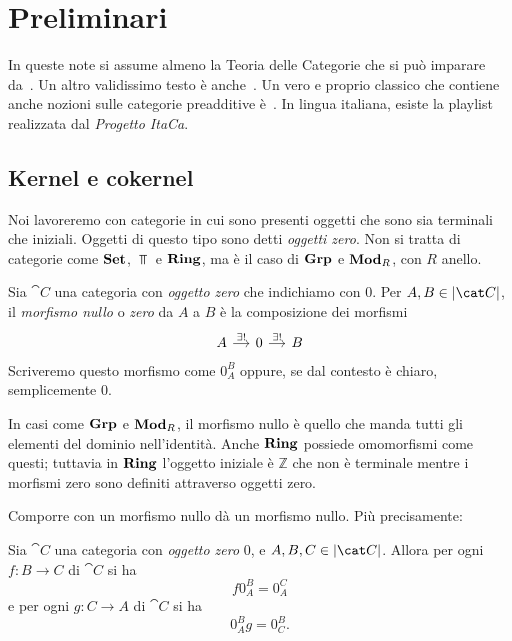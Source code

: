 
\chapter{Preliminari}

In queste note si assume almeno la {\sc Teoria delle Categorie} che si
può imparare da~\cite{leinster:categories}. Un altro validissimo testo è
anche~\cite{riehl:categories}. Un vero e proprio classico che contiene
anche nozioni sulle categorie preadditive
è~\cite{maclane:categories}. In lingua italiana,
esiste la playlist~\cite{itaca:categorie} realizzata dal {\em Progetto ItaCa}.



\section{Kernel e cokernel}

Noi lavoreremo con categorie in cui sono presenti oggetti che sono sia
terminali che iniziali. Oggetti di questo tipo sono detti {\em oggetti
  zero}. Non si tratta di categorie come \(\mathbf{Set}\), \(\Top\) e \(\mathbf{Ring}\),
ma è il caso di \(\mathbf{Grp}\) e \(\mathbf{Mod}_R\), con \(R\) anello.

\begin{definition}
  Sia \(\cat C\) una categoria con {\em oggetto zero} che indichiamo con
  \(0\). Per \(A, B \in \obj{\cat C}\), il {\em morfismo nullo} o {\em
    zero} da \(A\) a \(B\) è la composizione dei morfismi
  \[
    \begin{tikzcd}[column sep=small]
      A \ar["{\exists!}", r] & 0 \ar["{\exists!}", r] & B
    \end{tikzcd}
  \]
  Scriveremo questo morfismo come \(0_A^B\) oppure, se dal contesto è
  chiaro, semplicemente \(0\).
\end{definition}

\begin{example}
  In casi come \(\mathbf{Grp}\) e \(\mathbf{Mod}_R\), il morfismo nullo è quello che
  manda tutti gli elementi del dominio nell'identità. Anche \(\mathbf{Ring}\)
  possiede omomorfismi come questi; tuttavia in \(\mathbf{Ring}\) l'oggetto
  iniziale è \(\mathbb{Z}\) che non è terminale mentre i morfismi zero sono
  definiti attraverso oggetti zero.
\end{example}

Comporre con un morfismo nullo dà un morfismo nullo. Più precisamente:

\begin{proposition}\label{lemma:CompCon0}
  Sia \(\cat C\) una categoria con {\em oggetto zero} \(0\), e
  \(A, B, C \in \obj{\cat C}\). Allora per ogni \(f : B \to C\) di
  \(\cat C\) si ha
  \[
    f 0_A^B = 0_A^C
  \]
  e per ogni \(g : C \to A\) di \(\cat C\) si ha
  \[
    0_A^B g = 0_C^B .
  \]
\end{proposition}

